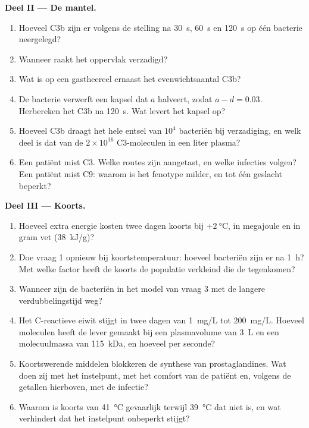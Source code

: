 \begin{problem}
\medskip
\noindent\textbf{Deel II --- De mantel.}
\begin{enumerate}[resume]
  \item Hoeveel C3b zijn er volgens de stelling na \qty{30}{s},
        \qty{60}{s} en \qty{120}{s} op één bacterie neergelegd?
  \item Wanneer raakt het oppervlak verzadigd?
  \item Wat is op een gastheercel ernaast het evenwichtsaantal C3b?
  \item De bacterie verwerft een kapsel dat $a$ halveert, zodat $a -
        d = 0.03$. Herbereken het C3b na \qty{120}{s}. Wat levert het
        kapsel op?
  \item Hoeveel C3b draagt het hele entsel van $10^{4}$ bacteriën bij
        verzadiging, en welk deel is dat van de $2\times 10^{16}$
        C3-moleculen in een liter plasma?
  \item Een patiënt mist C3. Welke routes zijn aangetast, en welke
        infecties volgen? Een patiënt mist C9: waarom is het fenotype
        milder, en tot één geslacht beperkt?
\end{enumerate}

\medskip
\noindent\textbf{Deel III --- Koorts.}
\begin{enumerate}[resume]
  \item Hoeveel extra energie kosten twee dagen koorts bij
        $+\qty{2}{\celsius}$, in megajoule en in gram vet
        (\qty{38}{kJ/g})?
  \item Doe vraag 1 opnieuw bij koortstemperatuur: hoeveel bacteriën
        zijn er na \qty{1}{h}? Met welke factor heeft de koorts de
        populatie verkleind die de  tegenkomen?
  \item Wanneer zijn de bacteriën in het model van vraag 3 met de
        langere verdubbelingstijd weg?
  \item Het C-reactieve eiwit stijgt in twee dagen van \qty{1}{mg/L} tot
        \qty{200}{mg/L}. Hoeveel moleculen heeft de lever gemaakt bij
        een plasmavolume van \qty{3}{L} en een molecuulmassa van
        \qty{115}{kDa}, en hoeveel per seconde?
  \item Koortswerende middelen blokkeren de synthese van
        prostaglandines. Wat doen zij met het instelpunt, met het
        comfort van de patiënt en, volgens de getallen hierboven, met
        de infectie?
  \item Waarom is koorts van \qty{41}{\celsius} gevaarlijk terwijl
        \qty{39}{\celsius} dat niet is, en wat verhindert dat het
        instelpunt onbeperkt stijgt?
\end{enumerate}


\end{problem}
